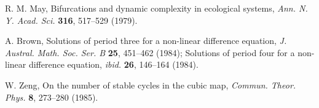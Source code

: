 \documentclass[twocolumn]{revtex4-1}
\begin{document}
\begin{thebibliography}{50}
  R. M. May,
  Bifurcations and dynamic complexity in ecological systems,
  \textit{Ann. N. Y. Acad. Sci.}
  \textbf{316},
  517--529
  (1979).

  A. Brown,
  Solutions of period three for a non-linear difference equation,
  \textit{J. Austral. Math. Soc. Ser. B}
  \textbf{25},
  451--462
  (1984);
%
  Solutions of period four for a non-linear difference equation,
  \textit{ibid.}
  \textbf{26},
  146--164
  (1984).

  W. Zeng,
  On the number of stable cycles in the cubic map,
  \textit{Commun. Theor. Phys.}
  \textbf{8},
  273--280
  (1985).

\end{thebibliography}
\end{document}

